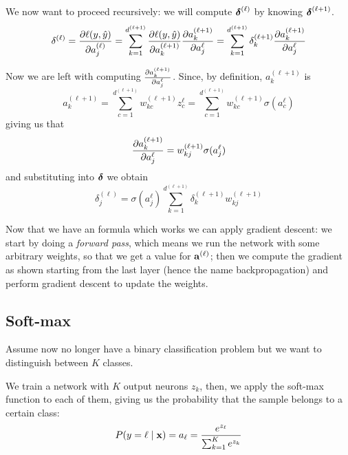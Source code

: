 \documentclass[12pt]{extarticle}
\renewcommand{\vec}[1]{\bvec{#1}}
\begin{document}
We now want to proceed recursively: we will compute $\vec \delta^{(\ell)}$ by knowing
$\vec \delta^{(\ell + 1)}$.
\begin{equation}
	\delta^{(\ell)} = \pdv{\ell(y, \hat y)}{a_j^{(\ell)}}
	= \sum_{k = 1}^{d^{(\ell + 1)}} \pdv{\ell(y, \hat y)}{a_k^{(\ell+1)}}\pdv{a_k^{(\ell + 1)}}{a_j^{\ell}}
	= \sum_{k = 1}^{d^{(\ell + 1)}} \delta^{(\ell + 1)}_k \pdv{a_k^{(\ell + 1)}}{a_j^{\ell}}
\end{equation}

Now we are left with computing $\pdv{a_k^{(\ell + 1)}}{a_j^{\ell}}$. Since, by definition,
$a_k^{(\ell + 1)}$ is
\begin{equation}
	a_k^{(\ell + 1)} = \sum^{d^{(\ell + 1)}}_{c = 1} w_{kc}^{(\ell + 1)} z_c^{\ell}
	= \sum^{d^{(\ell + 1)}}_{c = 1} w_{kc}^{(\ell + 1)} \sigma(a_c^{\ell})
\end{equation}
giving us that
\begin{equation}
	\pdv{a_k^{(\ell + 1)}}{a_j^{\ell}} = w_{kj}^{(\ell + 1)} \sigma(a_j^{\ell})
\end{equation}
and substituting into $\vec \delta$ we obtain
\begin{equation}
	\delta^{(\ell)}_j = \sigma(a_j^{\ell}) \sum_{k = 1}^{d^{(\ell + 1)}}
	\delta_k^{(\ell + 1)} w_{kj}^{(\ell + 1)}
\end{equation}

Now that we have an formula which works we can apply gradient descent: we start by doing a
\emph{forward pass}, which means we run the network with some arbitrary weights, so that we get a
value for $\vec a^{(\ell)}$; then we compute the gradient as shown starting from the last layer
(hence the name backpropagation) and perform gradient descent to update the weights.

\subsection{Soft-max}

Assume now no longer have a binary classification problem but we want to distinguish between $K$
classes.

We train a network with $K$ output neurons $z_k$, then, we apply the soft-max function to each of
them, giving us the probability that the sample belongs to a certain class:
\begin{equation}
	P(y = \ell \mid \vec x) = a_\ell = \frac {e^{z_\ell}}{\sum_{k = 1}^{K} e^{z_k}}
\end{equation}
\end{document}
